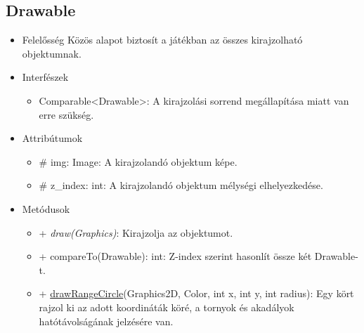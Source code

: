 \subsection{Drawable}
\begin{itemize}
\item Felelősség \newline
Közös alapot biztosít a játékban az összes kirajzolható objektumnak.
\item Interfészek
\begin{itemize}
	\item Comparable<Drawable>: A kirajzolási sorrend megállapítása miatt van erre szükség.
\end{itemize}
\item Attribútumok
	\begin{itemize}
		\item \# img: Image: A kirajzolandó objektum képe.
		\item \# z\_index: int: A kirajzolandó objektum mélységi elhelyezkedése.
	\end{itemize}
\item Metódusok
	\begin{itemize}
		\item + \textit{draw(Graphics)}: Kirajzolja az objektumot.
		\item + compareTo(Drawable): int: Z-index szerint hasonlít össze két Drawable-t.
		\item + \underline{drawRangeCircle}(Graphics2D, Color, int x, int y, int radius): Egy kört rajzol ki az adott koordináták köré, a tornyok és akadályok hatótávolságának jelzésére van.
	\end{itemize}
\end{itemize}

